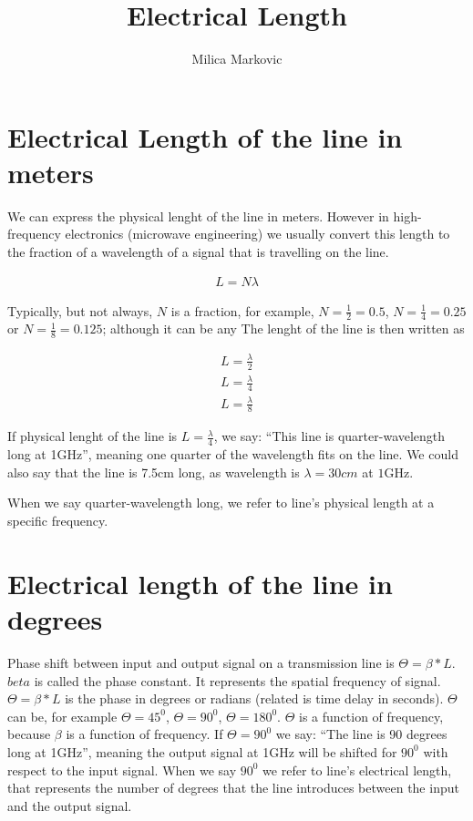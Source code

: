 \documentclass{ximera}
\title{Electrical Length}
\author{Milica Markovic}
\begin{document}
  
\begin{abstract}  

\end{abstract}  
\maketitle    





\section{Electrical Length of the line in meters}

We can express the physical lenght of the line in meters. However in high-frequency electronics (microwave engineering) we usually convert this length to the fraction of a wavelength of a signal that is travelling on the line. 


\begin{eqnarray}
 L=N \lambda
\end{eqnarray}
 

Typically, but not always, $N$ is a fraction, for example,  $N=\frac{1}{2}=0.5$, $N=\frac{1}{4}=0.25$ or $N=\frac{1}{8}=0.125$; although it can be any  The lenght of the line is then written as


\begin{eqnarray}
 L=\frac{\lambda}{2}  \\
 L=\frac{\lambda}{4}  \\
  L=\frac{\lambda}{8}  
\end{eqnarray}
 


If physical lenght of the line is $L=\frac{\lambda}{4}$, we say: “This line is quarter-wavelength long at 1GHz”, meaning one quarter of the wavelength fits on the line. We could also say that the line is 7.5cm long, as wavelength is $\lambda=30 \unit{cm}$ at $1$GHz.


When we say quarter-wavelength long, we refer to line’s physical length at a specific frequency. 

\section{Electrical length of the line in degrees}

Phase shift between input and output signal on a transmission line is  
$\Theta=\beta*L$.
$beta$ is called the phase constant. It represents the spatial frequency of signal.
$\Theta=\beta*L$ is the phase in degrees or radians (related is time delay in seconds).
$\Theta$  can be, for example $\Theta = 45^0$, $\Theta = 90^0$, $\Theta = 180^0$. $\Theta$ is a function of frequency, because $\beta$ is a function of frequency.
 If $\Theta = 90^0$ we say: “The line is 90 degrees long at 1GHz”, meaning the output signal at 1GHz will be shifted for $90^0$ with respect to the input signal. 
When we say $90^0$ we refer to line’s electrical length, that represents the number of degrees that the line introduces between the input and the output signal.
\end{document}
